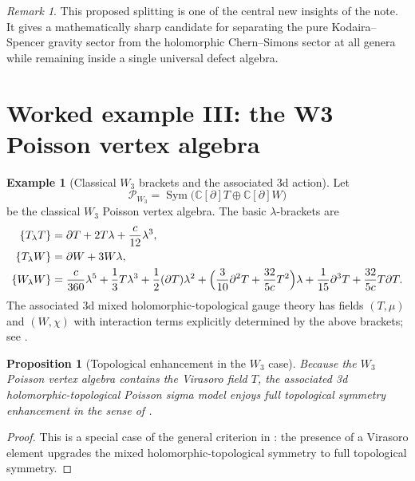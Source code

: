 \documentclass[11pt]{article}
\newtheorem{proposition}[theorem]{Proposition}
\theoremstyle{definition}
\newtheorem{example}[theorem]{Example}
\theoremstyle{remark}
\newtheorem{remark}[theorem]{Remark}
\newcommand{\Sym}{\operatorname{Sym}}
\begin{document}
\begin{remark}
This proposed splitting is one of the central new insights of the note. It gives a mathematically sharp candidate for separating the pure Kodaira--Spencer gravity sector from the holomorphic Chern--Simons sector at all genera while remaining inside a single universal defect algebra.
\end{remark}

\section{Worked example III: the W3 Poisson vertex algebra}\label{sec:W3}

\begin{example}[Classical $W_3$ brackets and the associated 3d action]\label{ex:W3-classical}
Let
\[
\mathcal P_{W_3}
=
\Sym\bigl(\mathbb C[\partial]T\oplus \mathbb C[\partial]W\bigr)
\]
be the classical $W_3$ Poisson vertex algebra. The basic $\lambda$-brackets are
\begin{align*}
\{T_\lambda T\}
&=
\partial T + 2T\lambda + \frac{c}{12}\lambda^3,
\\
\{T_\lambda W\}
&=
\partial W + 3W\lambda,
\\
\{W_\lambda W\}
&=
\frac{c}{360}\lambda^5
+\frac{1}{3}T\lambda^3
+\frac{1}{2}(\partial T)\lambda^2
+\Bigl(\frac{3}{10}\partial^2T+\frac{32}{5c}T^2\Bigr)\lambda
+\frac{1}{15}\partial^3T
+\frac{32}{5c}T\partial T.
\end{align*}
The associated 3d mixed holomorphic-topological gauge theory has fields $(T,\mu)$ and $(W,\chi)$ with interaction terms explicitly determined by the above brackets; see \cite[\S3.4]{KZ2025}.
\end{example}

\begin{proposition}[Topological enhancement in the $W_3$ case]\label{prop:w3-topological-enhancement}
Because the $W_3$ Poisson vertex algebra contains the Virasoro field $T$, the associated 3d holomorphic-topological Poisson sigma model enjoys full topological symmetry enhancement in the sense of \cite{KZ2025}.
\end{proposition}

\begin{proof}
This is a special case of the general criterion in \cite{KZ2025}: the presence of a Virasoro element upgrades the mixed holomorphic-topological symmetry to full topological symmetry.
\end{proof}
\end{document}
